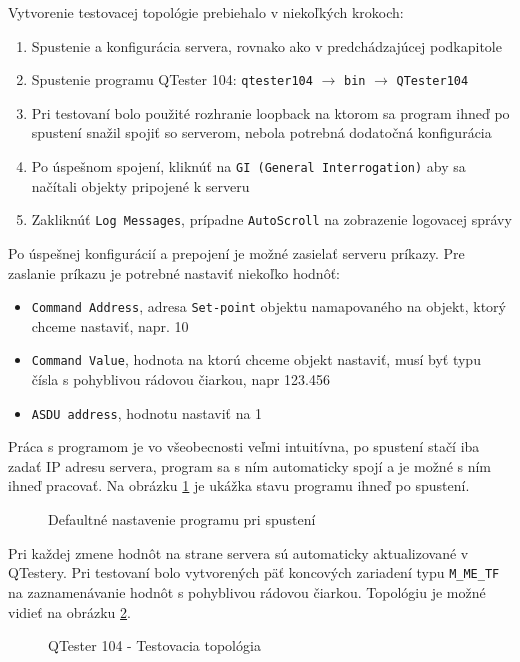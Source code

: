Vytvorenie testovacej topológie prebiehalo v niekoľkých krokoch:
\begin{enumerate}
\item Spustenie a konfigurácia servera, rovnako ako v predchádzajúcej podkapitole
\item Spustenie programu QTester 104: {\tt qtester104} $\rightarrow$ {\tt bin} $\rightarrow$ {\tt QTester104}
\item Pri testovaní bolo použité rozhranie loopback na ktorom sa program ihneď po spustení snažil spojiť so serverom, nebola potrebná dodatočná konfigurácia
\item Po úspešnom spojení, kliknúť na {\tt GI (General Interrogation)} aby sa načítali objekty pripojené k serveru
\item Zakliknúť {\tt Log Messages}, prípadne {\tt AutoScroll} na zobrazenie logovacej správy
\end{enumerate}
Po úspešnej konfigurácií a prepojení je možné zasielať serveru príkazy. Pre zaslanie príkazu je potrebné nastaviť niekoľko hodnôť:
\begin{itemize}
\item {\tt Command Address}, adresa {\tt Set-point} objektu namapovaného na objekt, ktorý chceme nastaviť, napr. 10
\item {\tt Command Value}, hodnota na ktorú chceme objekt nastaviť, musí byť typu čísla s pohyblivou rádovou čiarkou, napr 123.456
\item {\tt ASDU address}, hodnotu nastaviť na 1
\end{itemize} \par
Práca s programom je vo všeobecnosti veľmi intuitívna, po spustení stačí iba zadať IP adresu servera, program sa s ním automaticky spojí a je možné s ním ihneď pracovať. Na obrázku \ref{QTester104} je ukážka stavu programu ihneď po spustení.
\begin{figure}[h]
    \centering
    \caption{Defaultné nastavenie programu pri spustení}
\label{QTester104}
\end{figure}
Pri každej zmene hodnôt na strane servera sú automaticky aktualizované v QTestery. Pri testovaní bolo vytvorených päť koncových zariadení typu {\tt M\_ME\_TF} na zaznamenávanie hodnôt s pohyblivou rádovou čiarkou. Topológiu je možné vidieť na obrázku \ref{QT-Topology}.
\begin{figure}[h]
    \centering
    \caption{QTester 104 - Testovacia topológia}
\label{QT-Topology}
\end{figure}
